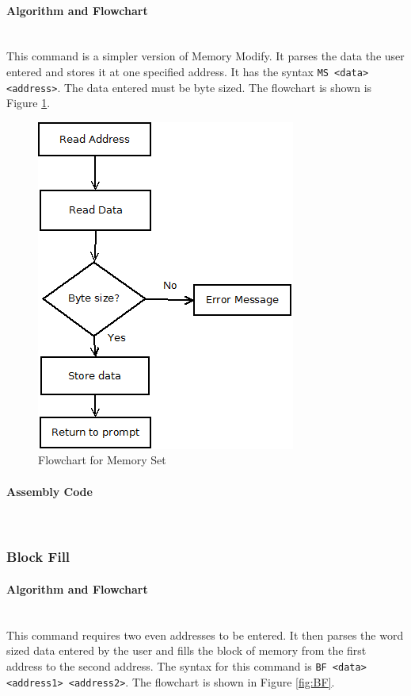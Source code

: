 \documentclass[12pt]{article}
\begin{document}
			\paragraph{Algorithm and Flowchart}~\\
			This command is a simpler version of Memory Modify. It parses the data the user entered and stores it at one specified address. It has the syntax \texttt{MS <data> <address>}. The data entered must be byte sized. The flowchart is shown is Figure \ref{fig:MS}.
			
			
\begin{figure}[H]
\centering
\includegraphics[width=0.7\linewidth]{MS}
\caption{Flowchart for Memory Set}
\label{fig:MS}
\end{figure}
			\paragraph{Assembly Code}~\\
			
			
			\subsubsection{Block Fill}
			\paragraph{Algorithm and Flowchart}~\\
			This command requires two even addresses to be entered. It then parses the word sized data entered by the user and fills the block of memory from the first address to the second address. The syntax for this command is \texttt{BF <data> <address1> <address2>}. The flowchart is shown in Figure \ref{fig:BF}.
			
\end{document}

